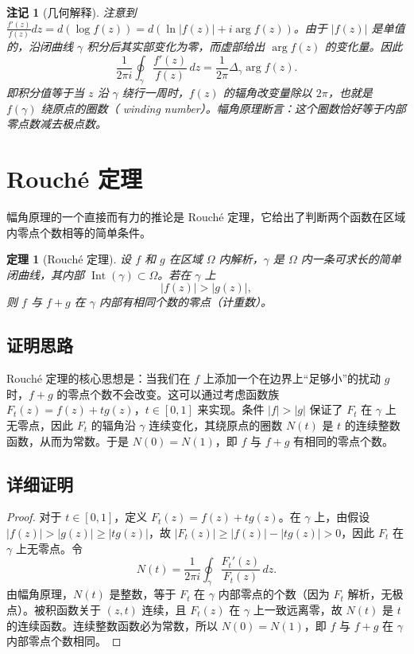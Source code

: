 \documentclass[UTF8]{ctexart}
\newtheorem{theorem}{定理}[section]
\newtheorem{remark}{注记}[section]
\numberwithin{equation}{section}
\begin{document}
\begin{remark}[几何解释]
注意到 $\frac{f'(z)}{f(z)}dz = d(\log f(z)) = d(\ln|f(z)| + i\arg f(z))$。由于 $|f(z)|$ 是单值的，沿闭曲线 $\gamma$ 积分后其实部变化为零，而虚部给出 $\arg f(z)$ 的变化量。因此
\[
\frac{1}{2\pi i}\oint_{\gamma} \frac{f'(z)}{f(z)}\,dz = \frac{1}{2\pi} \Delta_{\gamma} \arg f(z).
\]
即积分值等于当 $z$ 沿 $\gamma$ 绕行一周时，$f(z)$ 的辐角改变量除以 $2\pi$，也就是 $f(\gamma)$ 绕原点的圈数（ winding number）。幅角原理断言：这个圈数恰好等于内部零点数减去极点数。
\end{remark}

\section{Rouché 定理}

幅角原理的一个直接而有力的推论是 Rouché 定理，它给出了判断两个函数在区域内零点个数相等的简单条件。

\begin{theorem}[Rouché 定理]
设 $f$ 和 $g$ 在区域 $\Omega$ 内解析，$\gamma$ 是 $\Omega$ 内一条可求长的简单闭曲线，其内部 $\operatorname{Int}(\gamma) \subset \Omega$。若在 $\gamma$ 上
\[
|f(z)| > |g(z)|,
\]
则 $f$ 与 $f+g$ 在 $\gamma$ 内部有相同个数的零点（计重数）。
\end{theorem}

\subsection{证明思路}

Rouché 定理的核心思想是：当我们在 $f$ 上添加一个在边界上“足够小”的扰动 $g$ 时，$f+g$ 的零点个数不会改变。这可以通过考虑函数族 $F_t(z)=f(z)+t g(z)$，$t\in[0,1]$ 来实现。条件 $|f|>|g|$ 保证了 $F_t$ 在 $\gamma$ 上无零点，因此 $F_t$ 的辐角沿 $\gamma$ 连续变化，其绕原点的圈数 $N(t)$ 是 $t$ 的连续整数函数，从而为常数。于是 $N(0)=N(1)$，即 $f$ 与 $f+g$ 有相同的零点个数。

\subsection{详细证明}

\begin{proof}
对于 $t\in[0,1]$，定义 $F_t(z)=f(z)+t g(z)$。在 $\gamma$ 上，由假设 $|f(z)| > |g(z)| \ge |t g(z)|$，故 $|F_t(z)| \ge |f(z)| - |t g(z)| > 0$，因此 $F_t$ 在 $\gamma$ 上无零点。令
\[
N(t) = \frac{1}{2\pi i}\oint_{\gamma} \frac{F_t'(z)}{F_t(z)}\,dz.
\]
由幅角原理，$N(t)$ 是整数，等于 $F_t$ 在 $\gamma$ 内部零点的个数（因为 $F_t$ 解析，无极点）。被积函数关于 $(z,t)$ 连续，且 $F_t(z)$ 在 $\gamma$ 上一致远离零，故 $N(t)$ 是 $t$ 的连续函数。连续整数函数必为常数，所以 $N(0)=N(1)$，即 $f$ 与 $f+g$ 在 $\gamma$ 内部零点个数相同。
\end{proof}
\end{document}
